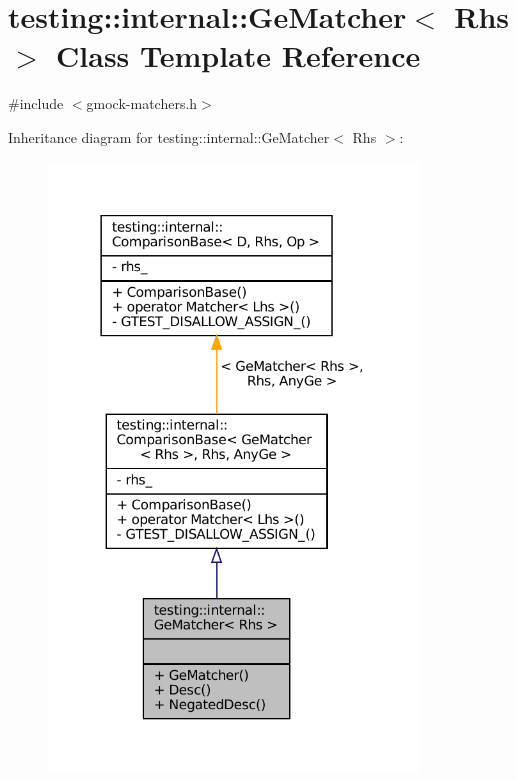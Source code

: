 \hypertarget{classtesting_1_1internal_1_1GeMatcher}{}\section{testing\+:\+:internal\+:\+:Ge\+Matcher$<$ Rhs $>$ Class Template Reference}
\label{classtesting_1_1internal_1_1GeMatcher}


{\ttfamily \#include $<$gmock-\/matchers.\+h$>$}



Inheritance diagram for testing\+:\+:internal\+:\+:Ge\+Matcher$<$ Rhs $>$\+:
\nopagebreak
\begin{figure}[H]
\begin{center}
\leavevmode
\includegraphics[width=278pt]{classtesting_1_1internal_1_1GeMatcher__inherit__graph}
\end{center}
\end{figure}



